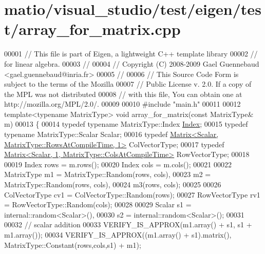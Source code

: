 \hypertarget{matio_2visual__studio_2test_2eigen_2test_2array__for__matrix_8cpp_source}{}\section{matio/visual\+\_\+studio/test/eigen/test/array\+\_\+for\+\_\+matrix.cpp}
\label{matio_2visual__studio_2test_2eigen_2test_2array__for__matrix_8cpp_source}

\begin{DoxyCode}
00001 \textcolor{comment}{// This file is part of Eigen, a lightweight C++ template library}
00002 \textcolor{comment}{// for linear algebra.}
00003 \textcolor{comment}{//}
00004 \textcolor{comment}{// Copyright (C) 2008-2009 Gael Guennebaud <gael.guennebaud@inria.fr>}
00005 \textcolor{comment}{//}
00006 \textcolor{comment}{// This Source Code Form is subject to the terms of the Mozilla}
00007 \textcolor{comment}{// Public License v. 2.0. If a copy of the MPL was not distributed}
00008 \textcolor{comment}{// with this file, You can obtain one at http://mozilla.org/MPL/2.0/.}
00009 
00010 \textcolor{preprocessor}{#include "main.h"}
00011 
00012 \textcolor{keyword}{template}<\textcolor{keyword}{typename} MatrixType> \textcolor{keywordtype}{void} array\_for\_matrix(\textcolor{keyword}{const} MatrixType& m)
00013 \{
00014   \textcolor{keyword}{typedef} \textcolor{keyword}{typename} MatrixType::Index \hyperlink{namespace_eigen_a62e77e0933482dafde8fe197d9a2cfde}{Index};
00015   \textcolor{keyword}{typedef} \textcolor{keyword}{typename} MatrixType::Scalar Scalar;
00016   \textcolor{keyword}{typedef} \hyperlink{group___core___module_class_eigen_1_1_matrix}{Matrix<Scalar, MatrixType::RowsAtCompileTime, 1>} 
      ColVectorType;
00017   \textcolor{keyword}{typedef} \hyperlink{group___core___module_class_eigen_1_1_matrix}{Matrix<Scalar, 1, MatrixType::ColsAtCompileTime>} 
      RowVectorType; 
00018 
00019   Index rows = m.rows();
00020   Index cols = m.cols();
00021 
00022   MatrixType m1 = MatrixType::Random(rows, cols),
00023              m2 = MatrixType::Random(rows, cols),
00024              m3(rows, cols);
00025 
00026   ColVectorType cv1 = ColVectorType::Random(rows);
00027   RowVectorType rv1 = RowVectorType::Random(cols);
00028   
00029   Scalar  s1 = internal::random<Scalar>(),
00030           s2 = internal::random<Scalar>();
00031           
00032   \textcolor{comment}{// scalar addition}
00033   VERIFY\_IS\_APPROX(m1.array() + s1, s1 + m1.array());
00034   VERIFY\_IS\_APPROX((m1.array() + s1).matrix(), MatrixType::Constant(rows,cols,s1) + m1);

\end{DoxyCode}
